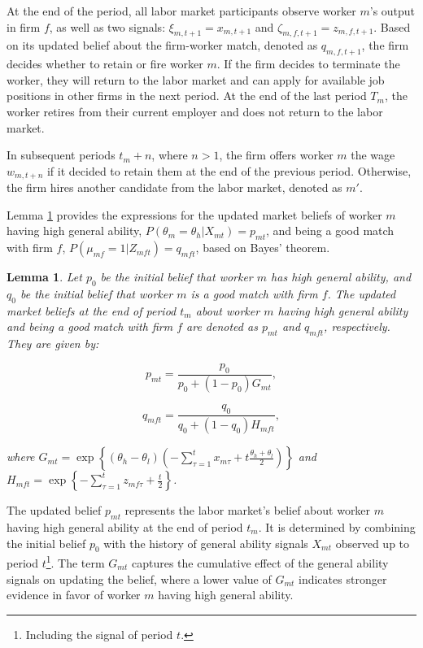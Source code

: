 \documentclass[12pt]{article}
\newtheorem{lemma}{Lemma}
\begin{document}
At the end of the period, all labor market participants observe worker $m$'s output in firm $f$, as well as two signals: $\xi_{m,t+1} = x_{m,t+1}$ and $\zeta_{m,f,t+1} = z_{m,f,t+1}$. Based on its updated belief about the firm-worker match, denoted as $q_{m,f,t+1}$, the firm decides whether to retain or fire worker $m$. If the firm decides to terminate the worker, they will return to the labor market and can apply for available job positions in other firms in the next period. At the end of the last period $T_m$, the worker retires from their current employer and does not return to the labor market.

In subsequent periods $t_m + n$, where $n > 1$, the firm offers worker $m$ the wage $w_{m,t+n}$ if it decided to retain them at the end of the previous period. Otherwise, the firm hires another candidate from the labor market, denoted as $m'$.

Lemma \ref{lemma:beliefs_NR} provides the expressions for the updated market beliefs of worker $m$ having high general ability, $P(\theta_m = \theta_h | X_{mt}) = p_{mt}$, and being a good match with firm $f$, $P(\mu_{mf} = 1 | Z_{mft}) = q_{mft}$, based on Bayes' theorem.

\begin{lemma}\label{lemma:beliefs_NR}
Let $p_0$ be the initial belief that worker $m$ has high general ability, and $q_0$ be the initial belief that worker $m$ is a good match with firm $f$. The updated market beliefs at the end of period $t_m$ about worker $m$ having high general ability and being a good match with firm $f$ are denoted as $p_{mt}$ and $q_{mft}$, respectively. They are given by:

\begin{equation}\label{eq:prob_NR}
p_{mt} = \frac{p_0}{p_0 + (1-p_0)G_{mt}},
\end{equation}

\begin{equation}\label{eq:qrob_NR}
q_{mft} = \frac{q_0}{q_0 + (1-q_0)H_{mft}},
\end{equation}

where $G_{mt} = \exp \left\lbrace \left(\theta_h - \theta_l\right)\left(-\sum_{\tau = 1}^{t} x_{m\tau} + t\frac{\theta_h + \theta_l}{2}\right)\right\rbrace$ and $H_{mft} = \exp \left\lbrace -\sum_{\tau = 1}^{t} z_{mf\tau} +\frac{t}{2}\right\rbrace$.
\end{lemma}

The updated belief $p_{mt}$ represents the labor market's belief about worker $m$ having high general ability at the end of period $t_m$. It is determined by combining the initial belief $p_0$ with the history of general ability signals $X_{mt}$ observed up to period $t$\footnote{Including the signal of period $t$.}. The term $G_{mt}$ captures the cumulative effect of the general ability signals on updating the belief, where a lower value of $G_{mt}$ indicates stronger evidence in favor of worker $m$ having high general ability.
\end{document}
